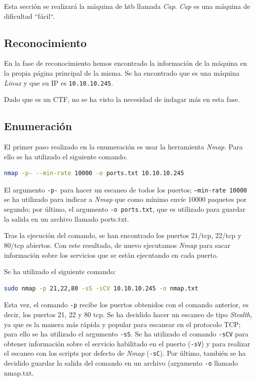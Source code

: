 Esta sección se realizará la máquina de \acrlong{htb} llamada \textit{Cap}\cite{cap}. \textit{Cap} es una máquina de dificultad ``fácil``.

\subsection{Reconocimiento}
En la fase de reconocimiento hemos encontrado la información de la máquina en la propia página principal\cite{cap} de la misma. Se ha encontrado que es una máquina \textit{Linux} y que su IP es \texttt{10.10.10.245}.

Dado que es un \acrshort{CTF}, no se ha visto la necesidad de indagar más en esta fase.

\subsection{Enumeración}
El primer paso realizado en la enumeración es usar la herramienta \textit{Nmap}\cite{nmap}. Para ello se ha utilizado el siguiente comando.
\begin{lstlisting}[language=bash]
nmap -p- --min-rate 10000 -o ports.txt 10.10.10.245
\end{lstlisting}
El argumento \texttt{-p-} para hacer un escaneo de todos los puertos; \texttt{--min-rate 10000} se ha utilizado para indicar a \textit{Nmap} que como mínimo envíe 10000 paquetes por segundo; por último, el argumento \texttt{-o ports.txt}, que es utilizado para guardar la salida en un archivo llamado ports.txt.

Tras la ejecución del comando, se han encontrado los puertos 21/\acrshort{tcp}, 22/\acrshort{tcp} y 80/\acrshort{tcp} abiertos. Con este resultado, de nuevo ejecutamos \textit{Nmap} para sacar información sobre los servicios que se están ejecutando en cada puerto.

Se ha utilizado el siguiente comando:
\begin{lstlisting}[language=bash]
sudo nmap -p 21,22,80 -sS -sCV 10.10.10.245 -o nmap.txt
\end{lstlisting}

Esta vez, el comando \texttt{-p} recibe los puertos obtenidos con el comando anterior, es decir, los puertos 21, 22 y 80 \acrshort{tcp}. Se ha decidido hacer un escaneo de tipo \textit{Stealth}, ya que es la manera más rápida y popular para escanear en el protocolo TCP; para ello se ha utilizado el argumento \texttt{-sS}. Se ha utilizado el comando \texttt{-sCV} para obtener información sobre el servicio habilitado en el puerto (\texttt{-sV}) y para realizar el escaneo con los scripts por defecto de \textit{Nmap} (\texttt{-sC}). Por último, también se ha decidido guardar la salida del comando en un archivo (argumento \texttt{-o} llamado nmap.txt.


